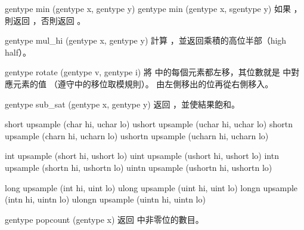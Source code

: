 gentype min (gentype x, gentype y)
gentype min (gentype x, sgentype y)
\stopbuffer
{}
如果 ，則返回 ，否則返回 。
\stopbuffer

gentype mul_hi (gentype x,
		gentype y)
\stopbuffer
{}
計算 ，並返回乘積的高位半部（high half）。
\stopbuffer

gentype rotate (gentype v, gentype i)
\stopbuffer
{}
將  中的每個元素都左移，其位數就是  中對應元素的值
（遵守中的移位取模規則）。
由左側移出的位再從右側移入。
\stopbuffer

gentype sub_sat (gentype x, gentype y)
\stopbuffer
{}
返回 ，並使結果飽和。
\stopbuffer

short upsample (char hi, uchar lo)
ushort upsample (uchar hi, uchar lo)
shortn upsample (charn hi, ucharn lo)
ushortn upsample (ucharn hi, ucharn lo)
\stopbuffer
{}
\par
{}
\stopbuffer
{}
int upsample (short hi, ushort lo)
uint upsample (ushort hi, ushort lo)
intn upsample (shortn hi, ushortn lo)
uintn upsample (ushortn hi, ushortn lo)
\stopbuffer
{}
\par
{}
\stopbuffer
{}
long upsample (int hi, uint lo)
ulong upsample (uint hi, uint lo)
longn upsample (intn hi, uintn lo)
ulongn upsample (uintn hi, uintn lo)
\stopbuffer
{}
\par
{}
\stopbuffer

gentype popcount (gentype x)
\stopbuffer
{}
返回  中非零位的數目。
\stopbuffer

\startCLFD


\stopCLFD

